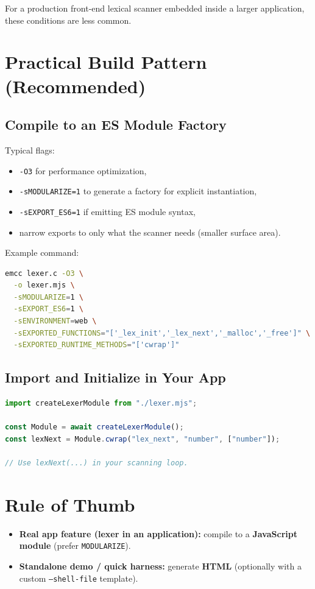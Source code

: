 \documentclass[11pt]{article}
\begin{document}
For a production front-end lexical scanner embedded inside a larger application, these conditions are less common.

\section*{Practical Build Pattern (Recommended)}
\subsection*{Compile to an ES Module Factory}
Typical flags:
\begin{itemize}[leftmargin=*, itemsep=0.25em]
  \item \texttt{-O3} for performance optimization,
  \item \texttt{-sMODULARIZE=1} to generate a factory for explicit instantiation,
  \item \texttt{-sEXPORT\_ES6=1} if emitting ES module syntax,
  \item narrow exports to only what the scanner needs (smaller surface area).
\end{itemize}

\noindent Example command:
\begin{lstlisting}[style=code, language=bash]
emcc lexer.c -O3 \
  -o lexer.mjs \
  -sMODULARIZE=1 \
  -sEXPORT_ES6=1 \
  -sENVIRONMENT=web \
  -sEXPORTED_FUNCTIONS="['_lex_init','_lex_next','_malloc','_free']" \
  -sEXPORTED_RUNTIME_METHODS="['cwrap']"
\end{lstlisting}

\subsection*{Import and Initialize in Your App}
\begin{lstlisting}[style=code, language=JavaScript]
import createLexerModule from "./lexer.mjs";

const Module = await createLexerModule();
const lexNext = Module.cwrap("lex_next", "number", ["number"]);

// Use lexNext(...) in your scanning loop.
\end{lstlisting}

\section*{Rule of Thumb}
\begin{itemize}[leftmargin=*, itemsep=0.35em]
  \item \textbf{Real app feature (lexer in an application):} compile to a \textbf{JavaScript module} (prefer \texttt{MODULARIZE}).
  \item \textbf{Standalone demo / quick harness:} generate \textbf{HTML} (optionally with a custom \texttt{--shell\allowbreak-file} template).
\end{itemize}
\end{document}
